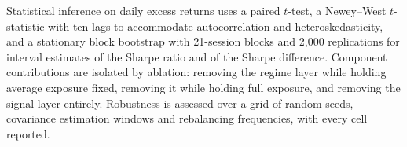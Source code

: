 Statistical inference on daily excess returns uses a paired $t$-test, a Newey--West
$t$-statistic with ten lags to accommodate autocorrelation and heteroskedasticity, and
a stationary block bootstrap with 21-session blocks and 2{,}000 replications for
interval estimates of the Sharpe ratio and of the Sharpe difference. Component
contributions are isolated by ablation: removing the regime layer while holding average
exposure fixed, removing it while holding full exposure, and removing the signal layer
entirely. Robustness is assessed over a grid of random seeds, covariance estimation
windows and rebalancing frequencies, with every cell reported.
